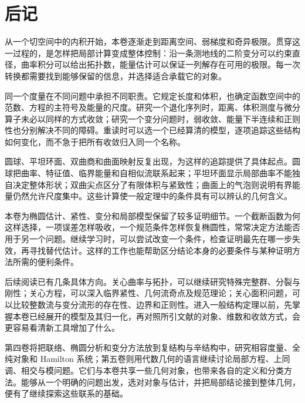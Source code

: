 \chapter*{后记}
从一个切空间中的内积开始，本卷逐渐走到距离空间、弱梯度和奇异极限。贯穿这一过程的，是怎样把局部计算变成整体控制：沿一条测地线的二阶变分可以约束直径，曲率积分可以给出拓扑数，能量估计可以保证一列解存在可用的极限。每一次转换都需要找到能够保留的信息，并选择适合承载它的对象。

\ProseParagraphBreak
同一个度量在不同问题中承担不同职责。它规定长度和体积，也确定函数空间中的范数、方程的主符号及能量的尺度。研究一个退化序列时，距离、体积测度与微分算子未必以同样的方式收敛；研究一个变分问题时，弱收敛、能量下半连续和正则性也分别解决不同的障碍。重读时可以选一个已经算清的模型，逐项追踪这些结构如何变化，而不急于把所有收敛归入同一个名称。

\ProseParagraphBreak
圆球、平坦环面、双曲商和曲面映射反复出现，为这样的追踪提供了具体起点。圆球把曲率、特征值、临界能量和自相似流联系起来；平坦环面显示局部曲率不能独自决定整体形状；双曲尖点区分了有限体积与紧致性；曲面上的气泡则说明有界能量仍然允许尺度集中。这些计算使一般定理中的条件具有可以辨认的几何含义。

\ProseParagraphBreak
本卷为椭圆估计、紧性、变分和局部模型保留了较多证明细节。一个截断函数为何这样选择，一项误差怎样吸收，一个规范条件怎样恢复椭圆性，常常决定方法能否用于另一个问题。继续学习时，可以尝试改变一个条件，检查证明最先在哪一步失效，再寻找替代估计。这样的工作也能帮助区分结论本身的必要条件与某种证明方法所需的便利条件。

\ProseParagraphBreak
后续阅读已有几条具体方向。关心曲率与拓扑，可以继续研究特殊完整群、分裂与刚性；关心方程，可以深入临界紧性、几何流奇点及规范理论；关心面积问题，可以比较整数流与变分流形的存在性、边界和正则性。进入一般结构定理以前，先掌握本卷已经展开的模型及其归一化，再对照所引文献的对象、维数和收敛方式，会更容易看清新工具增加了什么。

\ProseParagraphBreak
第四卷将把联络、椭圆分析和变分方法放到复结构与辛结构中，研究相容度量、全纯对象和 Hamilton 系统；第五卷则用代数几何的语言继续讨论局部方程、上同调、相交与模问题。它们与本卷共享一些几何对象，也带来各自的定义和分类方法。能够从一个明确的问题出发，选对对象与估计，并把局部结论接到整体几何，便有了继续探索这些联系的基础。
